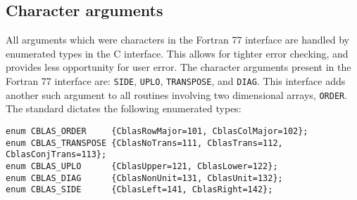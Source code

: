 \documentclass{article}
\begin{document}
\subsection{Character arguments}
\label{sec-EnumType}


All arguments which were characters in the Fortran 77 interface are handled by
enumerated types in the C interface.  This allows for tighter error checking,
and provides less opportunity for user error.  The character arguments present
in the Fortran 77 interface are: {\tt SIDE}, {\tt UPLO}, {\tt TRANSPOSE}, and
{\tt DIAG}.  This interface adds another such argument to all routines involving 
two dimensional arrays, {\tt ORDER}.  The standard dictates the following
enumerated types:

\begin{Verbatim}[fontsize=\small,fontfamily=tt,fontshape=rm]
enum CBLAS_ORDER     {CblasRowMajor=101, CblasColMajor=102};
enum CBLAS_TRANSPOSE {CblasNoTrans=111, CblasTrans=112, CblasConjTrans=113};
enum CBLAS_UPLO      {CblasUpper=121, CblasLower=122};
enum CBLAS_DIAG      {CblasNonUnit=131, CblasUnit=132};
enum CBLAS_SIDE      {CblasLeft=141, CblasRight=142};
\end{Verbatim}
\end{document}
